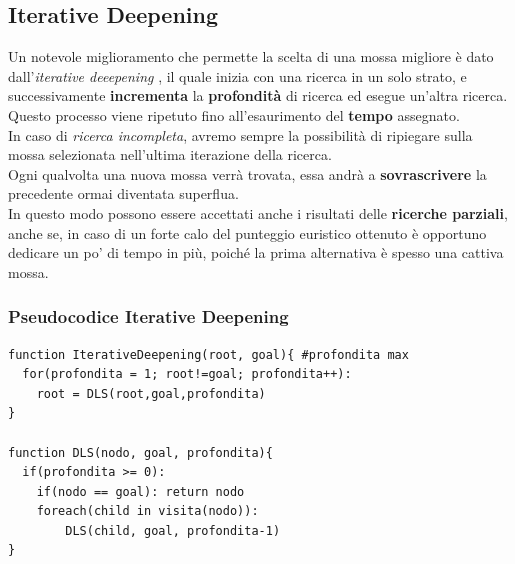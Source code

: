 \documentclass{article}
\begin{document}
    \subsection{Iterative Deepening}
    Un notevole miglioramento che permette la scelta di una mossa migliore è dato dall'\textit{iterative deeepening} \cite{Iterative_Deepening}, il quale inizia con una ricerca in un solo strato, e successivamente \textbf{incrementa} la \textbf{profondità} di ricerca ed esegue un'altra ricerca.\\ Questo processo viene ripetuto fino all'esaurimento del \textbf{tempo} assegnato.\\ In caso di \textit{ricerca incompleta}, avremo sempre la possibilità di ripiegare sulla mossa selezionata nell'ultima iterazione della ricerca. \\
    Ogni qualvolta una nuova mossa verrà trovata, essa andrà a \textbf{sovrascrivere} la precedente ormai diventata superflua.\\
    In questo modo possono essere accettati anche i risultati delle \textbf{ricerche parziali}, anche se, in caso di un forte calo del punteggio euristico ottenuto è opportuno dedicare un po' di tempo in più, poiché la prima alternativa è spesso una cattiva mossa.
    
    
    
        \subsubsection{Pseudocodice Iterative Deepening}
    \lstset{language=java, numbers=left,numbersep=8pt,  }
    \begin{lstlisting}[frame=single]  
function IterativeDeepening(root, goal){ #profondita max
  for(profondita = 1; root!=goal; profondita++):
    root = DLS(root,goal,profondita) 
}

function DLS(nodo, goal, profondita){
  if(profondita >= 0):
    if(nodo == goal): return nodo
    foreach(child in visita(nodo)):
        DLS(child, goal, profondita-1)
}
    \end{lstlisting}
    
\end{document}
